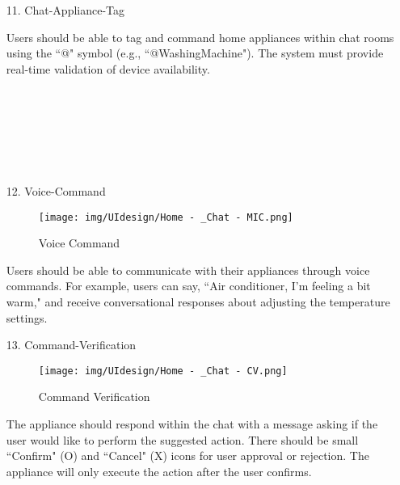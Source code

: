 \documentclass[conference]{IEEEtran}
\begin{document}
\begin{enumerate}
\begin{itemize}
\begin{itemize}
\begin{enumerate}
\begin{enumerate}
    \item[11.] Chat-Appliance-Tag
    
    Users should be able to tag and command home appliances within chat rooms using the ``@" symbol (e.g., ``@WashingMachine"). The system must provide real-time validation of device availability. \\ \\ \\ \\ \\ \\ \\
\end{enumerate}

\begin{enumerate}
    \item[12.] Voice-Command
    \begin{figure}[h]
        {\centering
        \hspace{4cm}
        \begin{minipage}{0.4\columnwidth}
            \texttt{[image: img/UIdesign/Home - \_Chat - MIC.png]}
            \caption{Voice Command}
        \end{minipage}}
    \end{figure}
    
    Users should be able to communicate with their appliances through voice commands. For example, users can say, ``Air conditioner, I'm feeling a bit warm," and receive conversational responses about adjusting the temperature settings. \\
\end{enumerate}

\begin{enumerate}
    \item[13.] Command-Verification
    \begin{figure}[h]
        {\centering
        \hspace{4cm}
        \begin{minipage}{0.4\columnwidth}
            \texttt{[image: img/UIdesign/Home - \_Chat - CV.png]}
            \caption{Command Verification}
        \end{minipage}}
    \end{figure}
    
    The appliance should respond within the chat with a message asking if the user would like to perform the suggested action. There should be small ``Confirm" (O) and ``Cancel" (X) icons for user approval or rejection. The appliance will only execute the action after the user confirms. \\ 
\end{enumerate}


\end{enumerate}
\end{itemize}
\end{itemize}
\end{enumerate}
\end{document}
